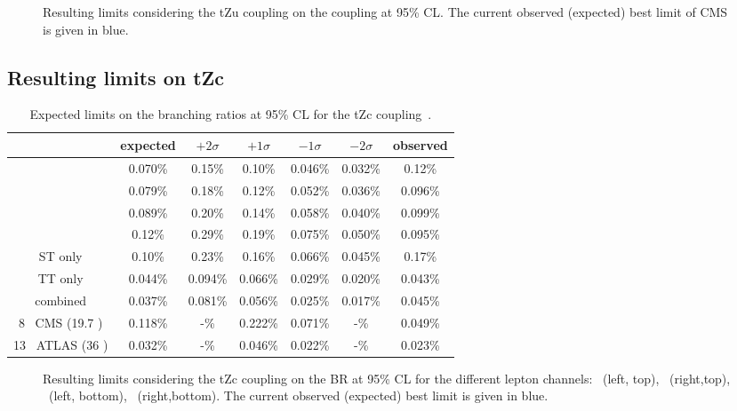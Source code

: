 \begin{figure}[ht]
	\centering
	\caption{Resulting limits considering the tZu coupling on the coupling at 95\%  CL. The current observed (expected) best limit of CMS is given in blue.}
	\label{fig:exclusionlimitbrfcnczutc}
\end{figure}


\subsection{Resulting limits on tZc}
\begin{table}[ht]
	\centering
	\caption{Expected limits on the branching ratios at 95\% CL for the tZc coupling~\cite{Sirunyan:2017kkr,ATLAS-CONF-2017-070}.}
	\begin{tabular}{|c|c|c|c|c|c|c|}
		\hline 
		& expected & $+2\sigma$ & $+1\sigma$ & $-1\sigma$ & $-2\sigma$ & observed \\ 
		\hline 
		\mumumu\ & 0.070\% & 0.15\% & 0.10\% & 0.046\% & 0.032\% & 0.12\% \\ 
		\hline 
		\emumu\ & 0.079\% & 0.18\% & 0.12\% & 0.052\% & 0.036\% & 0.096\% \\ 
		\hline 
		\eemu\ & 0.089\% & 0.20\% & 0.14\% & 0.058\% & 0.040\% & 0.099\% \\ 
		\hline 
		\eee\ & 0.12\% & 0.29\% & 0.19\% & 0.075\% & 0.050\% & 0.095\% \\ 
		\hline 
		ST only & 0.10\% & 0.23\% & 0.16\% & 0.066\% & 0.045\% & 0.17\% \\ 
		\hline 
		TT only & 0.044\% & 0.094\% & 0.066\% & 0.029\% & 0.020\% & 0.043\% \\ 
		\hline 
		combined & 0.037\% & 0.081\% & 0.056\% & 0.025\% & 0.017\% & 0.045\% \\ 
		\hline
		8 \TeV\ CMS (19.7 \fbinv)    & 0.118\% & -\% &0.222\% & 0.071\% & -\% & 0.049\%\\
		\hline
		13 \TeV\ ATLAS (36 \fbinv)    & 0.032\% & -\% & 0.046\% & 0.022\%& -\% & 0.023\%\\
		\hline
	\end{tabular} 
	\label{tab:ResultsTZC}
\end{table}
\begin{figure}[ht]
	\centering
	\caption{Resulting limits considering the tZc coupling on the BR at 95\%  CL for the different lepton channels: \mumumu\ (left, top), \emumu\ (right,top), \eee\ (left, bottom), \eemu\ (right,bottom). The current observed (expected) best limit is given in blue.}
	\label{fig:exclusionlimitbrfcnczctchannels}
\end{figure}

